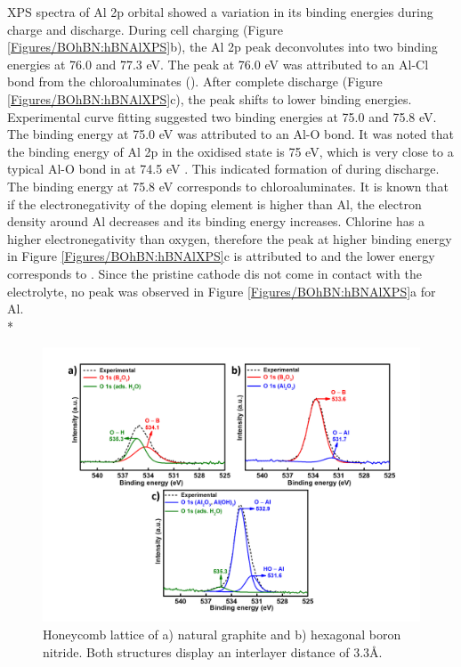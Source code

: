 XPS spectra of Al 2p orbital showed a variation in its binding energies during charge and discharge. During cell charging (Figure \ref{Figures/BOhBN:hBNAlXPS}b), the Al 2p peak deconvolutes into two binding energies at 76.0 and 77.3 eV. The peak at 76.0 eV was attributed to an Al-Cl bond from the chloroaluminates (). After complete discharge (Figure \ref{Figures/BOhBN:hBNAlXPS}c), the peak shifts to lower binding energies. Experimental curve fitting suggested two binding energies at 75.0 and 75.8 eV. The binding energy at 75.0 eV was attributed to an Al-O bond. It was noted that the binding energy of Al 2p in the oxidised state is 75 eV, which is very close to a typical Al-O bond in  at 74.5 eV \cite{}. This indicated formation of  during discharge. The binding energy at 75.8 eV corresponds to chloroaluminates. It is known that if the electronegativity of the doping element is higher than Al, the electron density around Al decreases and its binding energy increases. Chlorine has a higher electronegativity than oxygen, therefore the peak at higher binding energy in Figure \ref{Figures/BOhBN:hBNAlXPS}c is attributed to  and the lower energy corresponds to . Since the pristine cathode dis not come in contact with the electrolyte, no peak was observed in Figure \ref{Figures/BOhBN:hBNAlXPS}a for Al. \\*

\begin{figure}[tbh!]
\centering
\includegraphics[width=\textwidth]{Figures/BOhBN/hBNOXPS}
\caption{Honeycomb lattice of a) natural graphite and b) hexagonal boron nitride. Both structures display an interlayer distance of 3.3\AA.}
\label{Figures/BOhBN:hBNOXPS}
\end{figure}

